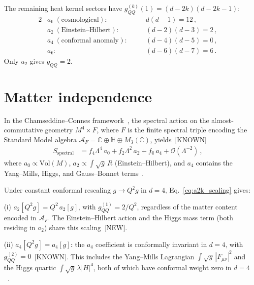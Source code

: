 \documentclass[prl,twocolumn,superscriptaddress,longbibliography]{revtex4-2}
\begin{document}
The remaining heat kernel sectors have
$g_{QQ}^{(k)}(1) = (d-2k)(d-2k-1)$:
\begin{alignat}{2}
  &a_0\ (\text{cosmological}): &\quad &d(d-1) = 12\,,
  \label{eq:a0}\\
  &a_2\ (\text{Einstein--Hilbert}): &\quad
  &(d\!-\!2)(d\!-\!3) = 2\,,
  \label{eq:a2}\\
  &a_4\ (\text{conformal anomaly}): &\quad
  &(d\!-\!4)(d\!-\!5) = 0\,,
  \label{eq:a4}\\
  &a_6: &\quad &(d\!-\!6)(d\!-\!7) = 6\,.
  \label{eq:a6}
\end{alignat}
Only $a_2$ gives $g_{QQ} = 2$.


\section{Matter independence}
\label{sec:matter}

In the Chamseddine--Connes framework~\cite{CC1996},
the spectral action on the almost-commutative
geometry $M^4 \times F$, where $F$ is the
finite spectral triple encoding the Standard Model
algebra
$\mathcal{A}_F = \mathbb{C} \oplus \mathbb{H}
\oplus M_3(\mathbb{C})$, yields~[KNOWN]
\begin{align}\label{eq:spectral_action}
  S_{\mathrm{spectral}}
  &= f_4\Lambda^4\, a_0
   + f_2\Lambda^2\, a_2
   + f_0\, a_4
   + \mathcal{O}(\Lambda^{-2})\,,
\end{align}
where $a_0 \propto \mathrm{Vol}(M)$,
$a_2 \propto \int\!\sqrt{g}\, R$ (Einstein--Hilbert),
and $a_4$ contains the Yang--Mills, Higgs, and
Gauss--Bonnet terms~\cite{CC1996,vS2024}.

Under constant conformal rescaling
$g \to Q^2 g$ in $d=4$,
Eq.~\eqref{eq:a2k_scaling} gives:

\smallskip
\noindent(i) $a_2[Q^2 g] = Q^2\, a_2[g]$, with
$g_{QQ}^{(1)} = 2/Q^2$, regardless of
the matter content encoded in $\mathcal{A}_F$.
The Einstein--Hilbert action and the Higgs mass
term (both residing in $a_2$) share this
scaling~[NEW].

\smallskip
\noindent(ii) $a_4[Q^2 g] = a_4[g]$: the $a_4$
coefficient is conformally invariant in $d=4$,
with $g_{QQ}^{(2)} = 0$~[KNOWN].
This includes the Yang--Mills Lagrangian
$\int\!\sqrt{g}\,|F_{\mu\nu}|^2$ and the
Higgs quartic $\int\!\sqrt{g}\,\lambda|H|^4$,
both of which have conformal weight zero in
$d=4$~\cite{Wald1984}.
\end{document}
